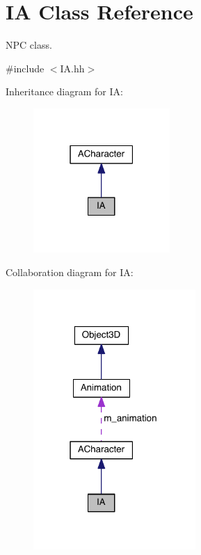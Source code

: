 \hypertarget{class_i_a}{}\section{I\+A Class Reference}
\label{class_i_a}


N\+P\+C class.  




{\ttfamily \#include $<$I\+A.\+hh$>$}



Inheritance diagram for I\+A\+:
\nopagebreak
\begin{figure}[H]
\begin{center}
\leavevmode
\includegraphics[width=147pt]{class_i_a__inherit__graph}
\end{center}
\end{figure}


Collaboration diagram for I\+A\+:
\nopagebreak
\begin{figure}[H]
\begin{center}
\leavevmode
\includegraphics[width=175pt]{class_i_a__coll__graph}
\end{center}
\end{figure}
